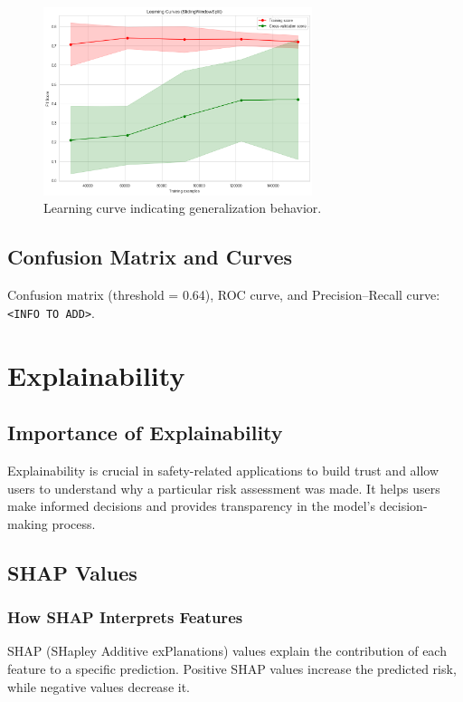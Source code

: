 \documentclass{article}
\begin{document}
\begin{figure}[H]
\centering
\includegraphics[width=0.7\textwidth]{LogisticRegression_learning_curve.png}
\caption{Learning curve indicating generalization behavior.}
\end{figure}

\subsection{Confusion Matrix and Curves}
Confusion matrix (threshold = 0.64), ROC curve, and Precision--Recall curve: \texttt{<INFO TO ADD>}.

\section{Explainability}

\subsection{Importance of Explainability}
Explainability is crucial in safety-related applications to build trust and allow users to understand why a particular risk assessment was made. It helps users make informed decisions and provides transparency in the model's decision-making process.

\subsection{SHAP Values}

\subsubsection{How SHAP Interprets Features}
SHAP (SHapley Additive exPlanations) values explain the contribution of each feature to a specific prediction. Positive SHAP values increase the predicted risk, while negative values decrease it.
\end{document}
